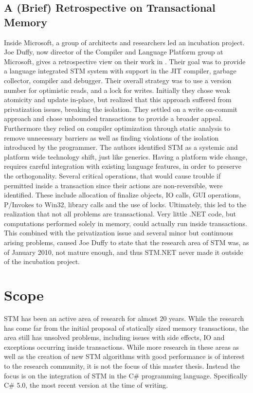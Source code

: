 \subsection{A (Brief) Retrospective on Transactional Memory}
Inside Microsoft, a group of architects and researchers led an incubation project. Joe Duffy, now director of the Compiler and Language Platform group at Microsoft, gives a retrospective view on their work in \cite{duffy2010stmnet}. Their goal was to provide a language integrated \ac{STM} system with support in the \ac{JIT} compiler, garbage collector, compiler and debugger. Their overall strategy was to use a version number for optimistic reads, and a lock for writes. Initially they chose weak atomicity and update in-place, but realized that this approach suffered from privatization issues, breaking the isolation. They settled on a write on-commit approach and chose unbounded transactions to provide a broader appeal. Furthermore they relied on compiler optimization through static analysis to remove unnecessary barriers as well as finding violations of the isolation introduced by the programmer. The authors identified \ac{STM} as a systemic and platform wide technology shift, just like generics. Having a platform wide change, requires careful integration with existing language features, in order to preserve the orthogonality. Several critical operations, that would cause trouble if permitted inside a transaction since their actions are non-reversible, were identified. These include allocation of finalize objects, \ac{IO} calls, GUI operations, P/Invokes to Win32, library calls and the use of locks. Ultimately, this led to the realization that not all problems are transactional. Very little .NET code, but computations performed solely in memory, could actually run inside transactions. This combined with the privatization issue and several minor but continuous arising problems, caused Joe Duffy to state that the research area of \ac{STM} was, as of January 2010, not mature enough, and thus STM.NET never made it outside of the incubation project.

\section{Scope}\label{sec:scope}
\ac{STM} has been an active area of research for almost 20 years\cite{shavit1997software}. While the research has come far from the initial proposal of statically sized memory transactions, the area still has unsolved problems, including issues with side effects, \ac{IO} and exceptions occurring inside transactions\cite{harris2005exceptions}. While more research in these areas as well as the creation of new \ac{STM} algorithms with good performance is of interest to the research community, it is not the focus of this master thesis. Instead the focus is on the integration of \ac{STM} in the C\# programming language. Specifically C\# 5.0, the most recent version at the time of writing\cite{csharp2013specificaiton}.

